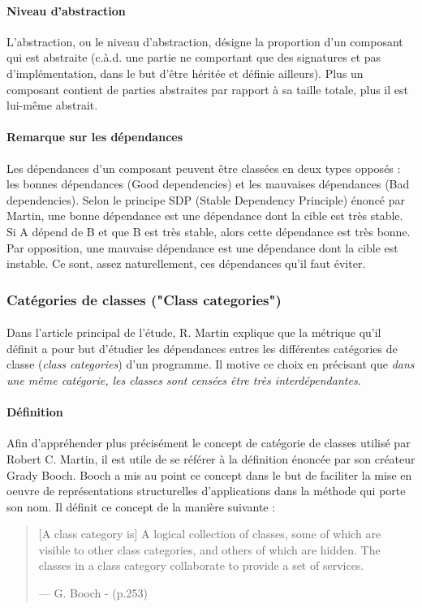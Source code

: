 \documentclass{scrartcl}
\begin{document}
    \paragraph{Niveau d'abstraction}L'abstraction, ou le niveau d'abstraction, désigne la proportion d'un composant qui est abstraite (c.à.d. une partie ne comportant que des signatures et pas d'implémentation, dans le but d'être héritée et définie ailleurs). Plus un composant contient de parties abstraites par rapport à sa taille totale, plus il est lui-même abstrait.
    
    \paragraph{Remarque sur les dépendances}Les dépendances d'un composant peuvent être classées en deux types opposés : les bonnes dépendances (Good dependencies) et les mauvaises dépendances (Bad dependencies). Selon le principe SDP (Stable Dependency Principle) énoncé par Martin, une bonne dépendance est une dépendance dont la cible est très stable. Si A dépend de B et que B est très stable, alors cette dépendance est très bonne. Par opposition, une mauvaise dépendance est une dépendance dont la cible est instable. Ce sont, assez naturellement, ces dépendances qu'il faut éviter.
    

\subsubsection{Catégories de classes ("Class categories")}
    \paragraph{}Dans l'article principal de l'étude\cite{Martin:1994}, R. Martin explique que la métrique qu'il définit a pour but d'étudier les dépendances entres les différentes catégories de classe (\emph{class categories}) d'un programme. Il motive ce choix en précisant que \og \textit{dans une même catégorie, les classes sont censées être très interdépendantes}\fg.
    
    \paragraph{Définition}Afin d'appréhender plus précisément le concept de catégorie de classes utilisé par Robert C. Martin, il est utile de se référer à la définition énoncée par son créateur Grady Booch\cite{Booch:1991}. Booch a mis au point ce concept dans le but de faciliter la mise en oeuvre de représentations structurelles d'applications dans la méthode qui porte son nom. Il définit ce concept de la manière suivante : 
    \begin{quote}
        [A class category is] A logical collection of classes, some of which are visible to other class categories, and others of which are hidden. The classes in a class category collaborate to provide a set of services.
        \begin{flushright}--- G. Booch - \cite{Booch:1991} (p.253)\end{flushright}
    \end{quote}
\end{document}
